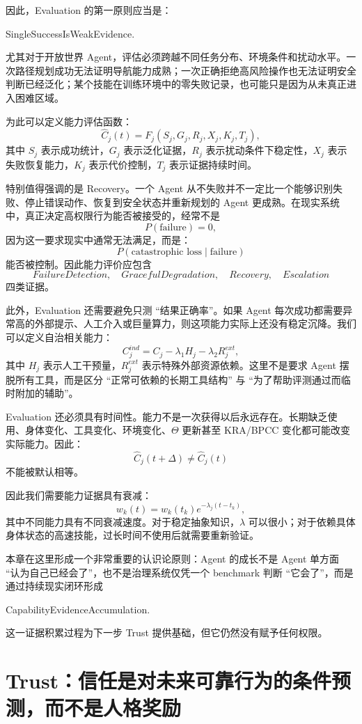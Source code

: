 因此，Evaluation 的第一原则应当是：
\begin{statementbox}
SingleSuccessIsWeakEvidence.
\end{statementbox}
尤其对于开放世界 Agent，评估必须跨越不同任务分布、环境条件和扰动水平。一次路径规划成功无法证明导航能力成熟；一次正确拒绝高风险操作也无法证明安全判断已经泛化；某个技能在训练环境中的零失败记录，也可能只是因为从未真正进入困难区域。

为此可以定义能力评估函数：
\[
\hat C_j(t)
=
F_j
\left(
S_j,
G_j,
R_j,
X_j,
K_j,
T_j
\right),
\]
其中 $S_j$ 表示成功统计，$G_j$ 表示泛化证据，$R_j$ 表示扰动条件下稳定性，$X_j$ 表示失败恢复能力，$K_j$ 表示代价控制，$T_j$ 表示证据持续时间。

特别值得强调的是 Recovery。一个 Agent 从不失败并不一定比一个能够识别失败、停止错误动作、恢复到安全状态并重新规划的 Agent 更成熟。在现实系统中，真正决定高权限行为能否被接受的，经常不是
\[
P(\text{failure})=0,
\]
因为这一要求现实中通常无法满足，而是：
\[
P(
\text{catastrophic loss}
\mid
\text{failure}
)
\]
能否被控制。因此能力评价应包含
\[
FailureDetection,
\quad
GracefulDegradation,
\quad
Recovery,
\quad
Escalation
\]
四类证据。

此外，Evaluation 还需要避免只测 ``结果正确率''。如果 Agent 每次成功都需要异常高的外部提示、人工介入或巨量算力，则这项能力实际上还没有稳定沉降。我们可以定义自治相关能力：
\[
C^{ind}_j
=
C_j
-
\lambda_1 H_j
-
\lambda_2 R^{ext}_j,
\]
其中 $H_j$ 表示人工干预量，$R^{ext}_j$ 表示特殊外部资源依赖。这里不是要求 Agent 摆脱所有工具，而是区分 ``正常可依赖的长期工具结构'' 与 ``为了帮助评测通过而临时附加的辅助''。

Evaluation 还必须具有时间性。能力不是一次获得以后永远存在。长期缺乏使用、身体变化、工具变化、环境变化、$\Theta$ 更新甚至 KRA/BPCC 变化都可能改变实际能力。因此：
\[
\hat C_j(t+\Delta)
\neq
\hat C_j(t)
\]
不能被默认相等。

因此我们需要能力证据具有衰减：
\[
w_k(t)
=
w_k(t_k)
e^{-\lambda_j(t-t_k)},
\]
其中不同能力具有不同衰减速度。对于稳定抽象知识，$\lambda$ 可以很小；对于依赖具体身体状态的高速技能，过长时间不使用后就需要重新验证。

本章在这里形成一个非常重要的认识论原则：Agent 的成长不是 Agent 单方面 ``认为自己已经会了''，也不是治理系统仅凭一个 benchmark 判断 ``它会了''，而是通过持续现实闭环形成
\begin{statementbox}
CapabilityEvidenceAccumulation.
\end{statementbox}
这一证据积累过程为下一步 Trust 提供基础，但它仍然没有赋予任何权限。

\section{Trust：信任是对未来可靠行为的条件预测，而不是人格奖励}

